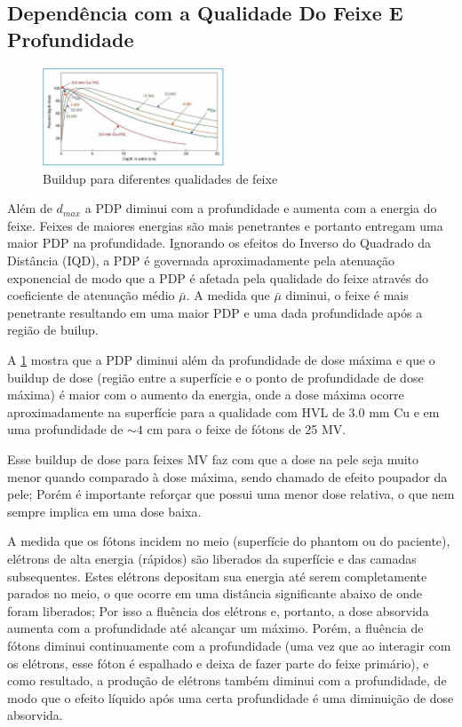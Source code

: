\documentclass[11pt,a4paper]{article}
\begin{document}
	\subsection{Dependência com a Qualidade Do Feixe E Profundidade}

		\begin{figure}
			\centering
			\includegraphics[width=0.48\textwidth]{Imagens/buildupDiferentesFeixes.JPG}
			\caption{Buildup para diferentes qualidades de feixe}
			\label{fig:buildupDiferentesFeixes}
		\end{figure}

	Além de $d_{max}$ a PDP diminui com a profundidade e aumenta com a energia do feixe. Feixes de maiores energias são mais penetrantes e portanto entregam uma maior PDP na profundidade. Ignorando os efeitos do Inverso do Quadrado da Distância (IQD), a PDP é governada aproximadamente pela atenuação exponencial de modo que a PDP é afetada pela qualidade do feixe através do coeficiente de atenuação médio $\bar{\mu}$.  A medida que $\bar{\mu}$ diminui, o feixe é mais penetrante resultando em uma maior PDP e uma dada profundidade após a região de builup. 

	A \ref{fig:buildupDiferentesFeixes} mostra que a PDP diminui além da profundidade de dose máxima e que o buildup de dose (região entre a superfície e o ponto de profundidade de dose máxima) é maior com o aumento da energia, onde a dose máxima ocorre aproximadamente na superfície para a qualidade com HVL de 3.0 mm Cu e em uma profundidade de $\sim 4$ cm para o feixe de fótons de 25 MV.

	Esse buildup de dose para feixes MV faz com que a dose na pele seja muito menor quando comparado à dose máxima, sendo chamado de efeito poupador da pele; Porém é importante reforçar que possui uma menor dose relativa, o que nem sempre implica em uma dose baixa.

		

	A medida que os fótons incidem no meio (superfície do phantom ou do paciente), elétrons de alta energia (rápidos) são liberados da superfície e das camadas subsequentes. Estes elétrons depositam sua energia até serem completamente parados no meio, o que ocorre em uma distância significante abaixo de onde foram liberados; Por isso  a fluência dos elétrons e, portanto, a dose absorvida aumenta com a profundidade até alcançar um máximo. Porém, a fluência de fótons diminui continuamente com a profundidade (uma vez que ao interagir com os elétrons, esse fóton é espalhado e deixa de fazer parte do feixe primário), e como resultado, a produção de elétrons também diminui com a profundidade, de modo que o efeito líquido após uma certa profundidade é uma diminuição de dose absorvida. 
\end{document}
